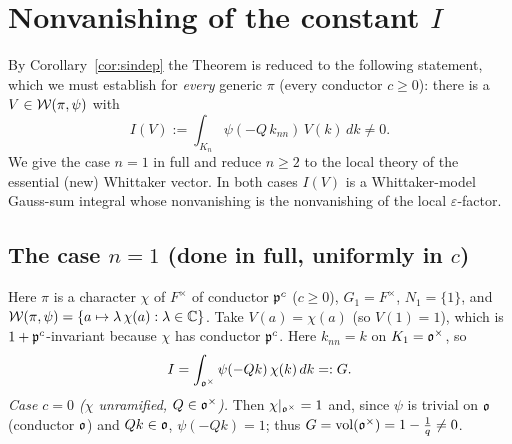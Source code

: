 \section*{Nonvanishing of the constant $I$}

By Corollary~\ref{cor:sindep} the Theorem is reduced to the following statement, which we must
establish for \emph{every} generic $\pi$ \textup{(}every conductor $c\ge0$\textup{)}: there is a
$V\in\mathcal{W}(\pi,\psi)$ with
\[
I(V):=\int_{K_n}\psi(-Q\,k_{nn})\,V(k)\,dk\neq0 .
\]
We give the case $n=1$ in full and reduce $n\ge2$ to the local theory of the essential
\textup{(}new\textup{)} Whittaker vector. In both cases $I(V)$ is a Whittaker-model Gauss-sum
integral whose nonvanishing is the nonvanishing of the local $\varepsilon$-factor.

\subsection*{The case $n=1$ \textup{(}done in full, uniformly in $c$\textup{)}}
Here $\pi$ is a character $\chi$ of $F^\times$ of conductor $\mathfrak{p}^{c}$ \textup{(}$c\ge0$\textup{)},
$G_1=F^\times$, $N_1=\{1\}$, and $\mathcal{W}(\pi,\psi)=\{a\mapsto \lambda\,\chi(a):\lambda\in\mathbb{C}\}$.
Take $V(a)=\chi(a)$ \textup{(}so $V(1)=1$\textup{)}, which is $1+\mathfrak{p}^{c}$-invariant because
$\chi$ has conductor $\mathfrak{p}^{c}$. Here $k_{nn}=k$ on $K_1=\mathfrak{o}^\times$, so
\[
I=\int_{\mathfrak{o}^\times}\psi(-Q k)\,\chi(k)\,dk=:G .
\]
\emph{Case $c=0$ \textup{(}$\chi$ unramified, $Q\in\mathfrak{o}^\times$\textup{)}.} Then
$\chi|_{\mathfrak{o}^\times}=1$ and, since $\psi$ is trivial on $\mathfrak{o}$ \textup{(}conductor
$\mathfrak{o}$\textup{)} and $Qk\in\mathfrak{o}$, $\psi(-Qk)=1$; thus
$G=\operatorname{vol}(\mathfrak{o}^\times)=1-\tfrac1q\neq0$.

